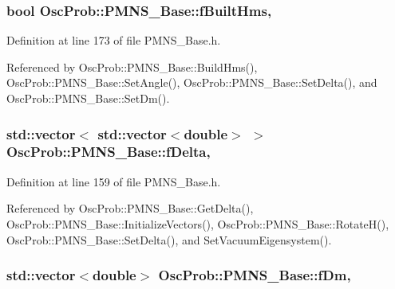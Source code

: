 \subsubsection[{\texorpdfstring{f\+Built\+Hms}{fBuiltHms}}]{\setlength{\rightskip}{0pt plus 5cm}bool Osc\+Prob\+::\+P\+M\+N\+S\+\_\+\+Base\+::f\+Built\+Hms\hspace{0.3cm}{\ttfamily [protected]}, {\ttfamily [inherited]}}\hypertarget{classOscProb_1_1PMNS__Base_a9ac3cadeac8db1b90f3152f476244780}{}\label{classOscProb_1_1PMNS__Base_a9ac3cadeac8db1b90f3152f476244780}


Definition at line 173 of file P\+M\+N\+S\+\_\+\+Base.\+h.



Referenced by Osc\+Prob\+::\+P\+M\+N\+S\+\_\+\+Base\+::\+Build\+Hms(), Osc\+Prob\+::\+P\+M\+N\+S\+\_\+\+Base\+::\+Set\+Angle(), Osc\+Prob\+::\+P\+M\+N\+S\+\_\+\+Base\+::\+Set\+Delta(), and Osc\+Prob\+::\+P\+M\+N\+S\+\_\+\+Base\+::\+Set\+Dm().

\subsubsection[{\texorpdfstring{f\+Delta}{fDelta}}]{\setlength{\rightskip}{0pt plus 5cm}std\+::vector$<$ std\+::vector$<$double$>$ $>$ Osc\+Prob\+::\+P\+M\+N\+S\+\_\+\+Base\+::f\+Delta\hspace{0.3cm}{\ttfamily [protected]}, {\ttfamily [inherited]}}\hypertarget{classOscProb_1_1PMNS__Base_ab2a5fa40e689b221c8a7d2c17213810d}{}\label{classOscProb_1_1PMNS__Base_ab2a5fa40e689b221c8a7d2c17213810d}


Definition at line 159 of file P\+M\+N\+S\+\_\+\+Base.\+h.



Referenced by Osc\+Prob\+::\+P\+M\+N\+S\+\_\+\+Base\+::\+Get\+Delta(), Osc\+Prob\+::\+P\+M\+N\+S\+\_\+\+Base\+::\+Initialize\+Vectors(), Osc\+Prob\+::\+P\+M\+N\+S\+\_\+\+Base\+::\+Rotate\+H(), Osc\+Prob\+::\+P\+M\+N\+S\+\_\+\+Base\+::\+Set\+Delta(), and Set\+Vacuum\+Eigensystem().

\subsubsection[{\texorpdfstring{f\+Dm}{fDm}}]{\setlength{\rightskip}{0pt plus 5cm}std\+::vector$<$double$>$ Osc\+Prob\+::\+P\+M\+N\+S\+\_\+\+Base\+::f\+Dm\hspace{0.3cm}{\ttfamily [protected]}, {\ttfamily [inherited]}}\hypertarget{classOscProb_1_1PMNS__Base_a406a31c3b5d620e5a0cace5b411f9f70}{}\label{classOscProb_1_1PMNS__Base_a406a31c3b5d620e5a0cace5b411f9f70}


